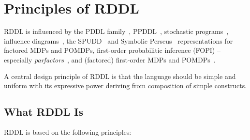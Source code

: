 \documentclass[11pt,a4paper]{article}
\begin{document}
\section{Principles of RDDL}

RDDL is influenced by the PDDL family~\cite{pddl_family},
PPDDL~\cite{ppddl}, stochastic programs~\cite{stochastic_programs},
influence diagrams~\cite{influence_diagrams}, the SPUDD~\cite{spudd}
and Symbolic Perseus~\cite{pascal_thesis,sym_perseus_code}
representations for factored MDPs and POMDPs, first-order probabilitic
inference (FOPI) -- especially \emph{parfactors}~\cite{fopi03}, and (factored)
first-order MDPs and POMDPs~\cite{fomdp,ffomdp,fo_pomdp}.  

A central design principle of RDDL is that the language should be
simple and uniform with its expressive power deriving from
composition of simple constructs.

\subsection{What RDDL Is}

RDDL is based on the following principles:
\end{document}
